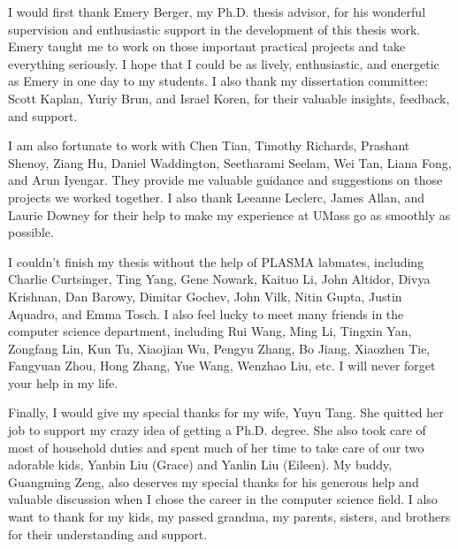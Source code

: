 I would first thank Emery Berger, my Ph.D. thesis advisor, for his wonderful supervision and enthusiastic support in the development of this thesis work. Emery taught me to work on those important practical projects and take everything seriously. I hope that I could be as lively, enthusiastic, and energetic as Emery in one day to my students. I also thank my dissertation committee: Scott Kaplan, Yuriy Brun, and Israel Koren, for their valuable insights, feedback, and support. 

I am also fortunate to work with Chen Tian, Timothy Richards, Prashant Shenoy, Ziang Hu, Daniel Waddington, Seetharami Seelam, Wei Tan, Liana Fong, and Arun Iyengar. They provide me valuable guidance and suggestions on those projects we worked together. I also thank Leeanne Leclerc, James Allan, and Laurie Downey for their help to make my experience at UMass go as smoothly as possible. 

I couldn't finish my thesis without the help of PLASMA  labmates, including Charlie Curtsinger, Ting Yang, Gene Nowark, Kaituo Li, John Altidor, Divya Krishnan, Dan Barowy, Dimitar Gochev, John Vilk, Nitin Gupta, Justin Aquadro, and Emma Tosch. I also feel lucky to meet many friends in the computer science department, including Rui Wang, Ming Li, Tingxin Yan, Zongfang Lin, Kun Tu, Xiaojian Wu, Pengyu Zhang, Bo Jiang, Xiaozhen Tie, Fangyuan Zhou, Hong Zhang, Yue Wang, Wenzhao Liu, etc. I will never forget your help in my life. 

Finally, I would give my special thanks for my wife, Yuyu Tang. She quitted her job to support my crazy idea of getting a Ph.D. degree. She also took care of most of household duties and spent much of her time to take care of our two adorable kids, Yanbin Liu (Grace) and Yanlin Liu (Eileen). My buddy, Guangming Zeng, also deserves my special thanks for his generous help and valuable discussion when I chose the career in the computer science field. I also want to thank for my kids, my passed grandma, my parents, sisters, and brothers for their understanding and support.    


